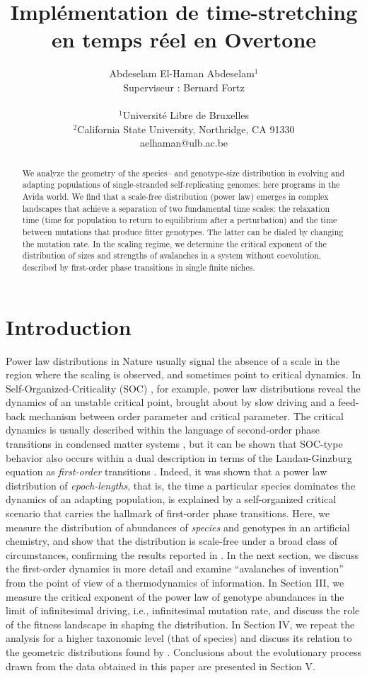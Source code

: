\documentclass[letterpaper]{article}
\title{Implémentation de time-stretching en temps réel en Overtone}
\author{Abdeselam El-Haman Abdeselam$^{1}$\\
Superviseur : Bernard Fortz
\mbox{}\\\\
$^1$Université Libre de Bruxelles \\
$^2$California State University, Northridge, CA 91330 \\
aelhaman@ulb.ac.be}
\begin{document}
\maketitle

\begin{abstract}
  We analyze the geometry of the species-- and genotype-size
  distribution in evolving and adapting populations of single-stranded
  self-replicating genomes: here programs in the Avida world.  We find
  that a scale-free distribution (power law) emerges in complex
  landscapes that achieve a separation of two fundamental time scales:
  the relaxation time (time for population to return to equilibrium
  after a perturbation) and the time between mutations that produce
  fitter genotypes. The latter can be dialed by changing the mutation
  rate.  In the scaling regime, we determine the
  critical exponent of the distribution of sizes and strengths of
  avalanches in a system without coevolution, described by first-order
  phase transitions in single finite niches.
\end{abstract}

\section{Introduction}

Power law distributions in Nature usually signal the absence of a
scale in the region where the scaling is observed, and sometimes point
to critical dynamics. In Self-Organized-Criticality (SOC)
\citep{BTW87,BTW88}, for example, power law distributions reveal the
dynamics of an unstable critical point, brought about by slow driving
and a feed-back mechanism between order parameter and critical
parameter.  The critical dynamics is usually described within the
language of second-order phase transitions in condensed matter systems
\citep{SJD}, but it can be shown that SOC-type behavior also occurs
within a dual description in terms of the Landau-Ginzburg equation as
{\em first-order} transitions \citep{GS}.  Indeed, it was shown that a
power law distribution of {\em epoch-lengths}, that is, the time a
particular species dominates the dynamics of an adapting population,
is explained by a self-organized critical scenario \citep{CA2} that
carries the hallmark of first-order phase transitions. Here, we
measure the distribution of abundances of {\em species} and genotypes
in an artificial chemistry, \citep[the Avida Artificial Life
system][]{AB1,OBA} and show that the distribution is scale-free under
a broad class of circumstances, confirming the results reported in
\citep{CA2}.  In the next section, we discuss the first-order dynamics
in more detail and examine ``avalanches of invention'' from the point
of view of a thermodynamics of information. In Section III, we measure
the critical exponent of the power law of genotype abundances in the
limit of infinitesimal driving, i.e., infinitesimal mutation rate, and
discuss the role of the fitness landscape in shaping the
distribution. In Section IV, we repeat the analysis for a higher
taxonomic level (that of species) and discuss its relation to the
geometric distributions found by \citet{BUR90,BUR93}.
Conclusions about the evolutionary process drawn from the data
obtained in this paper are presented in Section V.
\end{document}
